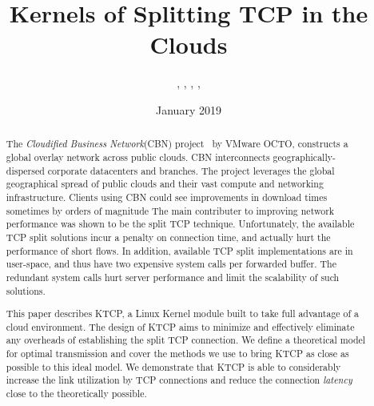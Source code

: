 \documentclass[newfonts=false,format=sigconf,9pt,letterpaper]{acmart}
\title{Kernels of Splitting TCP in the Clouds}
\author{\aut{Markuze Alex}{1,2}, \aut{Bergman Aran}{1}, \aut{Dar Chen}{1}, \aut{Issac Keslassy}{2},
        \aut{Israel Cidon}{1,2}}
\affiliation{%
  \institution{$^1$VMware Research\quad $^2$Technion\quad}
}
\date{January 2019}
\newcommand{\oursys}{KTCP\xspace}
\newcommand{\mycomm}[3]{{\footnotesize{{\color{#2} \textbf{[#1: #3]}}}}}
\newcommand{\IK}[1]{\mycomm{IK}{blue}{#1}}
\newcommand{\AB}[1]{\mycomm{AB}{darkgreen}{#1}}
\begin{document}
\begin{abstract}
The \emph{Cloudified Business Network}(CBN) project~\cite{Elastic, CDD} by VMware OCTO, 
constructs a global overlay network across public clouds. CBN interconnects geographically-dispersed corporate datacenters and branches. The project leverages the global geographical spread of public clouds and their vast compute and networking infrastructure.
Clients using CBN could see improvements in download times sometimes by orders of magnitude
The main contributer to improving network performance was shown to be the split TCP technique. 
Unfortunately, the available TCP split solutions incur a penalty on connection time, and actually hurt the performance of short flows. In addition, available TCP split implementations are in user-space, and thus have two expensive system calls per forwarded buffer. The redundant system calls hurt server performance and limit the scalability of such solutions. 

This paper describes \oursys, a Linux Kernel module built to take full advantage of a cloud environment.  
The design of \oursys aims to minimize and effectively eliminate any overheads of establishing the split TCP connection. We define a theoretical model for optimal transmission and cover the methods we use to bring \oursys as close as possible to this ideal model. We demonstrate that \oursys is able to considerably increase the link utilization by TCP connections and reduce the connection \emph{latency} close to the theoretically possible.

\end{abstract}

\maketitle









\end{document}
